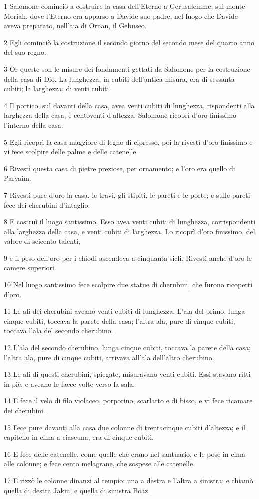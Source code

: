 \par 1 Salomone cominciò a costruire la casa dell'Eterno a Gerusalemme, sul monte Moriah, dove l'Eterno era apparso a Davide suo padre, nel luogo che Davide aveva preparato, nell'aia di Ornan, il Gebuseo.
\par 2 Egli cominciò la costruzione il secondo giorno del secondo mese del quarto anno del suo regno.
\par 3 Or queste son le misure dei fondamenti gettati da Salomone per la costruzione della casa di Dio. La lunghezza, in cubiti dell'antica misura, era di sessanta cubiti; la larghezza, di venti cubiti.
\par 4 Il portico, sul davanti della casa, avea venti cubiti di lunghezza, rispondenti alla larghezza della casa, e centoventi d'altezza. Salomone ricoprì d'oro finissimo l'interno della casa.
\par 5 Egli ricoprì la casa maggiore di legno di cipresso, poi la rivestì d'oro finissimo e vi fece scolpire delle palme e delle catenelle.
\par 6 Rivestì questa casa di pietre preziose, per ornamento; e l'oro era quello di Parvaim.
\par 7 Rivestì pure d'oro la casa, le travi, gli stipiti, le pareti e le porte; e sulle pareti fece dei cherubini d'intaglio.
\par 8 E costruì il luogo santissimo. Esso avea venti cubiti di lunghezza, corrispondenti alla larghezza della casa, e venti cubiti di larghezza. Lo ricoprì d'oro finissimo, del valore di seicento talenti;
\par 9 e il peso dell'oro per i chiodi ascendeva a cinquanta sicli. Rivestì anche d'oro le camere superiori.
\par 10 Nel luogo santissimo fece scolpire due statue di cherubini, che furono ricoperti d'oro.
\par 11 Le ali dei cherubini aveano venti cubiti di lunghezza. L'ala del primo, lunga cinque cubiti, toccava la parete della casa; l'altra ala, pure di cinque cubiti, toccava l'ala del secondo cherubino.
\par 12 L'ala del secondo cherubino, lunga cinque cubiti, toccava la parete della casa; l'altra ala, pure di cinque cubiti, arrivava all'ala dell'altro cherubino.
\par 13 Le ali di questi cherubini, spiegate, misuravano venti cubiti. Essi stavano ritti in piè, e aveano le facce volte verso la sala.
\par 14 E fece il velo di filo violaceo, porporino, scarlatto e di bisso, e vi fece ricamare dei cherubini.
\par 15 Fece pure davanti alla casa due colonne di trentacinque cubiti d'altezza; e il capitello in cima a ciascuna, era di cinque cubiti.
\par 16 E fece delle catenelle, come quelle che erano nel santuario, e le pose in cima alle colonne; e fece cento melagrane, che sospese alle catenelle.
\par 17 E rizzò le colonne dinanzi al tempio: una a destra e l'altra a sinistra; e chiamò quella di destra Jakin, e quella di sinistra Boaz.

